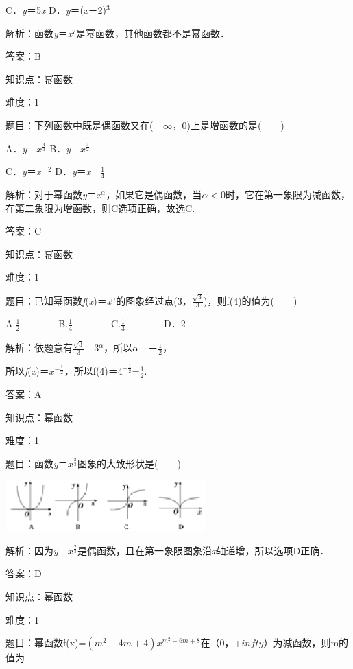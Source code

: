 \documentclass{article} %
\begin{document}
C．\textit{y}＝5\textit{x}   D．\textit{y}＝(\textit{x}＋2)${}^{3}$

解析：函数\textit{y}＝\textit{x}${}^{7}$是幂函数，其他函数都不是幂函数．

答案：B

知识点：幂函数

难度：1

题目：下列函数中既是偶函数又在(－$\mathrm{\infty}$，0)上是增函数的是(　　)

A．\textit{y}＝$x^{\frac{4}{3}}$  B．\textit{y}＝$x^{\frac{3}{2}}$

C．\textit{y}＝\textit{x}${}^{\textrm{－}}$${}^{2}$   D．\textit{y}＝\textit{x}－$\frac{1}{4}$

解析：对于幂函数\textit{y}＝\textit{x${}^{\alpha }$}，如果它是偶函数，当\textit{$\alpha$}$\mathrm{<}$0时，它在第一象限为减函数，在第二象限为增函数，则C选项正确，故选C.

答案：C

知识点：幂函数

难度：1

题目：已知幂函数\textit{f}(\textit{x})＝\textit{x${}^{\alpha }$}的图象经过点(3，$\frac{\sqrt{3}}{3}$)，则f(4)的值为(　　)

A.$\frac{1}{2}$　　　　B.$\frac{1}{4}$　　　　C.$\frac{1}{3}$　　　　D．2

解析：依题意有$\frac{\sqrt{3}}{3}$＝3\textit{${}^{\alpha }$}，所以\textit{$\alpha$}＝－$\frac{1}{2}$，

所以\textit{f}(\textit{x})＝$x^{-\frac{1}{2}}$，所以f(4)＝$4^{-\frac{1}{2}}$=$\frac{1}{2}$.

答案：A

知识点：幂函数

难度：1

题目：函数\textit{y}＝$x^{\frac{2}{3}}$图象的大致形状是(　　)

\includegraphics*[width=3.05in, height=0.78in, keepaspectratio=false]{image65}

解析：因为\textit{y}＝$x^{\frac{2}{3}}$是偶函数，且在第一象限图象沿\textit{x}轴递增，所以选项D正确．

答案：D

知识点：幂函数

难度：1

题目：幂函数f(x)=$(m^{2}-4m+4)x^{m^{2}-6m+8}$在（0，+$infty$）为减函数，则m的值为
\end{document}
